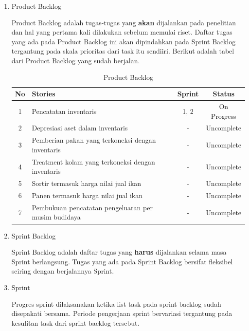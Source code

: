 \begin{enumerate}
	\item Product Backlog
	
	Product Backlog adalah tugas-tugas yang \textbf{akan} dijalankan pada penelitian dan hal yang pertama kali dilakukan sebelum memulai riset. Daftar tugas yang ada pada Product Backlog ini akan dipindahkan pada Sprint Backlog tergantung pada skala prioritas dari task itu sendiiri. Berikut adalah tabel dari Product Backlog yang sudah berjalan.

	\begin{table}[H]	
		\begin{center}
			\caption{Product Backlog}
			\label{tab:table5}
			\begin{tabular}{|c|m{17em}|c|c|}
			\hline
			\textbf{No} & \textbf{Stories} & \textbf{Sprint} & \textbf{Status} \\
			\hline
			1 & Pencatatan inventaris & 1, 2 & On Progress \\
			\hline
			2 & Depresiasi aset dalam inventaris & - & Uncomplete \\
			\hline
			3 & Pemberian pakan yang terkoneksi dengan inventaris & - & Uncomplete \\
			\hline
			4 & Treatment kolam yang terkoneksi dengan inventaris & - & Uncomplete \\
			\hline
			5 & Sortir termasuk harga nilai jual ikan & - & Uncomplete \\
			\hline
			6 & Panen termasuk harga nilai jual ikan & - & Uncomplete \\
			\hline
			7 & Pembukuan pencatatan pengeluaran per musim budidaya & - & Uncomplete \\
			\hline
			\end{tabular}
		\end{center}
	\end{table}	

	\item Sprint Backlog
	
	Sprint Backlog adalah daftar tugas yang \textbf{harus} dijalankan selama masa Sprint berlangsung. Tugas yang ada pada Sprint Backlog bersifat fleksibel seiring dengan berjalannya Sprint.

	\item Sprint
	
	Progres sprint dilaksanakan ketika list task pada sprint backlog sudah disepakati bersama. Periode pengerjaan sprint bervariasi tergantung pada kesulitan task dari sprint backlog tersebut.


\end{enumerate}
